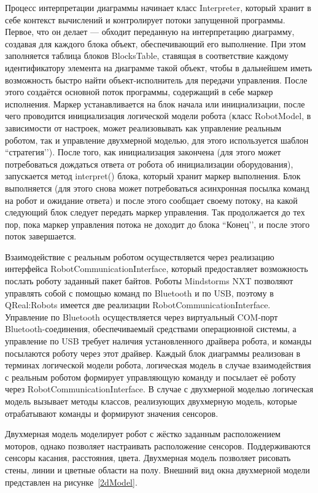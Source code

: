 \documentclass[a4paper]{article}
\begin{document}
Процесс интерпретации диаграммы начинает класс Interpreter, который хранит в себе контекст вычислений и контролирует потоки запущенной программы. Первое, что он делает --- обходит переданную на интерпретацию диаграмму, создавая для каждого блока объект, обеспечивающий его выполнение. При этом заполняется таблица блоков BlocksTable, ставящая в соответствие каждому идентификатору элемента на диаграмме такой объект, чтобы в дальнейшем иметь возможность быстро найти объект-исполнитель для передачи управления. После этого создаётся основной поток программы, содержащий в себе маркер исполнения. Маркер устанавливается на блок начала или инициализации, после чего проводится инициализация логической модели робота (класс RobotModel, в зависимости от настроек, может реализовывать как управление реальным роботом, так и управление двухмерной моделью, для этого используется шаблон ``стратегия’’). После того, как инициализация закончена (для этого может потребоваться дождаться ответа от робота об инициализации оборудования), запускается метод interpret() блока, который хранит маркер выполнения. Блок выполняется (для этого снова может потребоваться асинхронная посылка команд на робот и ожидание ответа) и после этого сообщает своему потоку, на какой следующий блок следует передать маркер управления. Так продолжается до тех пор, пока маркер управления потока не доходит до блока ``Конец’’, и после этого поток завершается.

Взаимодействие с реальным роботом осуществляется через реализацию интерфейса RobotCommunicationInterface, который предоставляет возможность послать роботу заданный пакет байтов. Роботы Mindstorms NXT позволяют управлять собой с помощью команд по Bluetooth и по USB, поэтому в QReal:Robots имеется две реализации RobotCommunicationInterface. Управление по Bluetooth осуществляется через виртуальный COM-порт Bluetooth-соединения, обеспечиваемый средствами операционной системы, а управление по USB требует наличия установленного драйвера робота, и команды посылаются роботу через этот драйвер. Каждый блок диаграммы реализован в терминах логической модели робота, логическая модель в случае взаимодействия с реальным роботом формирует управляющую команду и посылает её роботу через RobotCommunicationInterface. В случае с двухмерной моделью логическая модель вызывает методы классов, реализующих двухмерную модель, которые отрабатывают команды и формируют значения сенсоров.

Двухмерная модель моделирует робот с жёстко заданным расположением моторов, однако позволяет настраивать расположение сенсоров. Поддерживаются сенсоры касания, расстояния, цвета. Двухмерная модель позволяет рисовать стены, линии и цветные области на полу. Внешний вид окна двухмерной модели представлен на рисунке~\ref{2dModel}.
\end{document}
